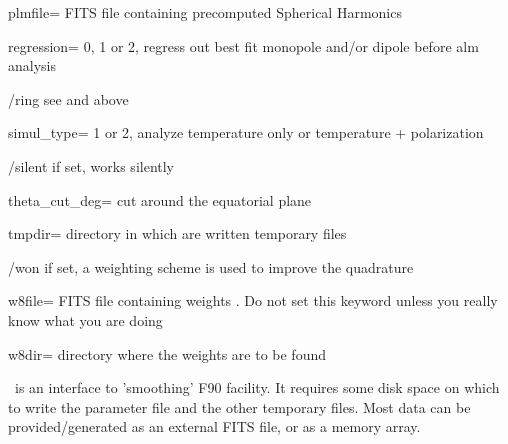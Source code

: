 \begin{keywords}
\begin{kwlist}{}
\item[plmfile=]  FITS file containing precomputed Spherical Harmonics 

\item[regression=]  0, 1 or 2, regress out best fit monopole and/or dipole before
    alm analysis

\item[/ring]  see 
 and 
 above

\item[simul\_type=]  1 or 2, analyze temperature only or temperature + polarization

\item[/silent]     if set, works silently

\item[theta\_cut\_deg=]  cut around the equatorial plane 

\item[tmpdir=]       directory in which are written temporary files 

\item[/won]      if set, a weighting scheme is used to improve the quadrature

\item[w8file=]     FITS file containing weights 
     .
   Do not set this keyword unless you really know what you are doing

\item[w8dir=]      directory where the weights are to be found 

  \end{kwlist}
\end{keywords}  

\begin{codedescription}
{\thedocid\ is an interface to 'smoothing' F90 facility. It
requires some disk space on which to write the parameter file and the other
temporary files. Most data can be provided/generated as an external FITS
file, or as a memory array.}
\end{codedescription}



